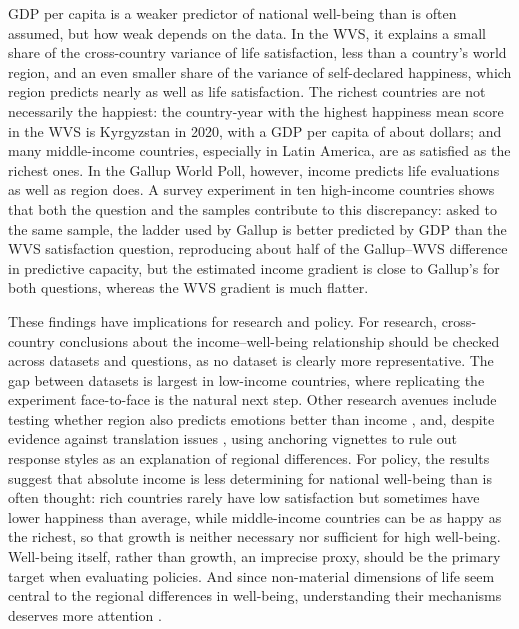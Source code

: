 \documentclass[12pt]{article}
\begin{document}
GDP per capita is a weaker predictor of national well-being than is often assumed, but how weak depends on the data. In the WVS, it explains a small share of the cross-country variance of life satisfaction, less than a country's world region, and an even smaller share of the variance of self-declared happiness, which region predicts nearly as well as life satisfaction.
The richest countries are not necessarily the happiest: the country-year with the highest happiness mean score in the WVS is Kyrgyzstan in 2020, %
with a GDP per capita of about \gdpKGZ dollars; and many middle-income countries, especially in Latin America, are as satisfied as the richest ones. In the Gallup World Poll, however, income predicts life evaluations as well as region does. A survey experiment in ten high-income countries shows that both the question and the samples contribute to this discrepancy: asked to the same sample, the ladder used by Gallup is better predicted by GDP than the WVS satisfaction question, reproducing about half of the Gallup--WVS difference in predictive capacity, but the estimated income gradient is close to Gallup's for both questions, whereas the WVS gradient is much flatter.

These findings have implications for research and policy. For research, cross-country conclusions about the income--well-being relationship should be checked across datasets and questions, as no dataset is clearly more representative. The gap between datasets is largest in low-income countries, where replicating the experiment face-to-face is the natural next step. Other research avenues include testing whether region also predicts emotions better than income \citep{blanchflower_wellbeing_2024,killingsworth_income_2023}, and, despite evidence against translation issues \citep{diener_culture_2000}, using anchoring vignettes to rule out response styles as an explanation of regional differences. For policy, the results suggest that absolute income is less determining for national well-being than is often thought: rich countries rarely have low satisfaction but sometimes have lower happiness than average, while middle-income countries can be as happy as the richest, so that growth is neither necessary nor sufficient for high well-being. Well-being itself, rather than growth, an imprecise proxy, should be the primary target when evaluating policies. And since non-material dimensions of life seem central to the regional differences in well-being, understanding their mechanisms deserves more attention \citep{stiglitz_report_2009,frijters_happy_2020}.

\clearpage

\end{document}
